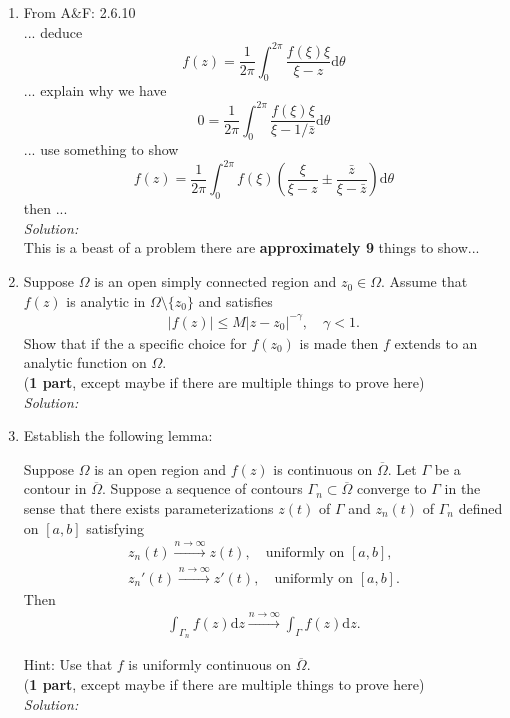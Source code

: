 \documentclass[10pt]{amsart}
\newcommand{\D}{\mathrm{d}}
\theoremstyle{nonumberplain}
\begin{document}
\begin{enumerate}[label={\bf {\arabic*}:}]
\item From A\&F: 2.6.10\\
... deduce
$$
f(z) = \frac 1 {2\pi} \int_0^{2\pi} \frac{f(\xi)\xi}{\xi - z} \D \theta
$$
... explain why we have
$$
0 = \frac 1 {2\pi} \int_0^{2\pi} \frac{f(\xi)\xi}{\xi - 1/\bar z} \D \theta
$$
... use something to show
$$
f(z) = \frac 1 {2\pi} \int_0^{2\pi} f(\xi) \left( \frac{\xi}{\xi - z} \pm \frac{\bar z}{\xi - \bar z} \right) \D \theta
$$
then ... \\
\textit{Solution:} \\
This is a beast of a problem there are \textbf{approximately 9} things to show... \\

\item Suppose $\Omega$ is an open simply connected region and $z_0 \in
  \Omega$.  Assume that $f(z)$ is analytic in $\Omega\setminus
  \{z_0\}$ and satisfies
  \begin{align*}
    |f(z)| \leq M |z - z_0|^{-\gamma}, \quad \gamma < 1.
  \end{align*}
  Show that if the a specific choice for $f(z_0)$ is made then $f$
  extends to an analytic function on $\Omega$. \\
(\textbf{1 part}, except maybe if there are multiple things to prove here) \\
\textit{Solution:} \\

\newpage
\item Establish the following lemma:\\
    \begin{lemma}
      Suppose $\Omega$ is an open region and $f(z)$ is continuous on
      $\overline \Omega$.  Let $\Gamma$ be a contour in $\overline
      \Omega$.  Suppose a sequence of contours $\Gamma_n \subset
      \overline \Omega$ converge to
      $\Gamma$ in the sense that there exists parameterizations $z(t)$
      of $\Gamma$ and $z_n(t)$ of $\Gamma_n$ defined on $[a,b]$
      satisfying
      \begin{align*}
        z_n(t) \overset{n \to \infty}{\longrightarrow} z(t),  \quad \text{
        uniformly on } [a,b],\\
        z_n'(t) \overset{n \to \infty}{\longrightarrow} z'(t), \quad \text{
        uniformly on } [a,b].
      \end{align*}
      Then
      \begin{align*}
        \int_{\Gamma_n} f(z) \D z \overset{n \to
        \infty}{\longrightarrow}   \int_{\Gamma} f(z) \D z.
      \end{align*}
    \end{lemma}
    Hint: Use that $f$ is uniformly continuous on $\overline \Omega$.\\
(\textbf{1 part}, except maybe if there are multiple things to prove here) \\
\textit{Solution:} \\


\end{enumerate}
\end{document}
